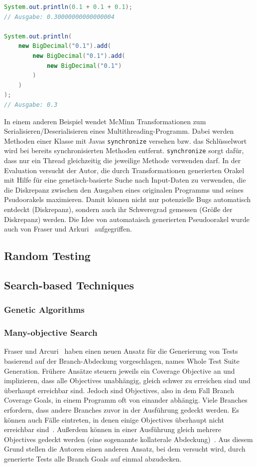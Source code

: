 \documentclass{article}
\begin{document}
\begin{lstlisting}[language=Java, caption=Comparing floating-point arithmetic in Java using double compared to BigDecimal~\cite{10.1145/1569901.1570127}, label=lst:java-transformations]
System.out.println(0.1 + 0.1 + 0.1);
// Ausgabe: 0.30000000000000004

System.out.println(
    new BigDecimal("0.1").add(
        new BigDecimal("0.1").add(
            new BigDecimal("0.1")
        )
    )
);
// Ausgabe: 0.3
\end{lstlisting}
In einem anderen Beispiel wendet McMinn Transformationen zum Serialisieren/Deserialisieren eines Multithreading-Programm. Dabei werden Methoden einer Klasse mit Javas \lstinline{synchronize} versehen bzw. das Schlüsselwort wird bei bereits synchronisierten Methoden entfernt. \lstinline{synchronize} sorgt dafür, dass nur ein Thread gleichzeitig die jeweilige Methode verwenden darf. In der Evaluation versucht der Autor, die durch Transformationen generierten Orakel mit Hilfe für eine genetisch-basierte Suche nach Input-Daten zu verwenden, die die Diskrepanz zwischen den Ausgaben eines originalen Programms und seines Psudoorakels maximieren. Damit können nicht nur potenzielle Bugs automatisch entdeckt (Diskrepanz), sondern auch ihr Schweregrad gemessen (Größe der Diskrepanz) werden. Die Idee von automataisch generierten Pseudoorakel wurde auch von Fraser und Arkuri~\cite{Fraser_2013} aufgegriffen. 

\subsection{Random Testing}
\subsection{Search-based Techniques}
\subsubsection{Genetic Algorithms}

\subsubsection{Many-objective Search}
 Fraser und Arcuri~\cite{Fraser_2013} haben einen neuen Ansatz für die Generierung von Tests basierend auf der Branch-Abdeckung vorgeschlagen, names Whole Test Suite Generation. Frühere Ansätze steuern jeweils ein Coverage Objective an und implizieren, dass alle Objectives unabhängig, gleich schwer zu erreichen sind und überhaupt erreichbar sind. Jedoch sind Objectives, also in dem Fall Branch Coverage Goals, in einem Programm oft von einander abhängig. Viele Branches erfordern, dass andere Branches zuvor in der Ausführung gedeckt werden. Es können auch Fälle eintreten, in denen einige Objectives überhaupt nicht erreichbar sind~\cite{Goldberg_1994}. Außerdem können in einer Ausführung gleich mehrere Objectives gedeckt werden (eine sogenannte kollaterale Abdeckung)~\cite{Fraser_2011}. Aus diesem Grund stellen die Autoren einen anderen Ansatz, bei dem versucht wird, durch generierte Tests alle Branch Goals auf einmal abzudecken. 
\end{document}
